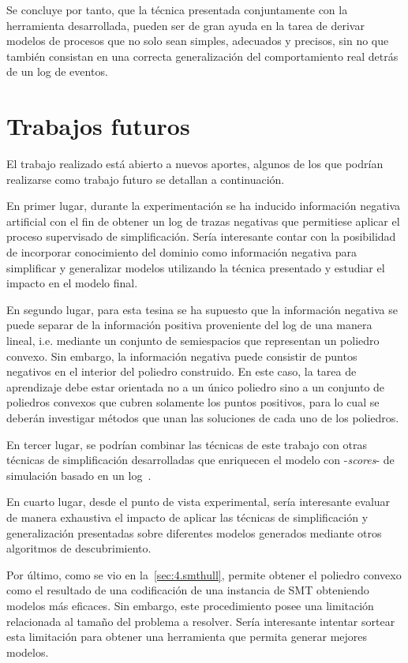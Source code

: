 Se concluye por tanto, que la técnica presentada conjuntamente con la herramienta desarrollada, pueden ser de
gran ayuda en la tarea de derivar modelos de procesos que no solo sean simples, adecuados y precisos, 
sin no que también consistan en una correcta generalización del comportamiento real detrás de un log de eventos.

\section*{Trabajos futuros}

El trabajo realizado está abierto a nuevos aportes, algunos de los que podrían realizarse como 
trabajo futuro se detallan a continuación.

En primer lugar, durante la experimentación se ha inducido información negativa artificial con el fin de obtener 
un log de trazas negativas que permitiese aplicar el proceso supervisado de simplificación. Sería 
interesante contar con la posibilidad de incorporar conocimiento del dominio como información
negativa para simplificar y generalizar modelos utilizando la técnica presentado y estudiar el 
impacto en el modelo final.

En segundo lugar, para esta tesina se ha supuesto que la información negativa se puede separar de la
información positiva proveniente del log de una manera lineal, i.e. mediante un conjunto de semiespacios
que representan un poliedro convexo. Sin embargo, la información negativa puede consistir de puntos negativos en el
interior del poliedro construido. En este caso, la tarea de aprendizaje debe estar orientada no a un único
poliedro sino a un conjunto de poliedros convexos que cubren solamente los puntos positivos, para lo cual
se deberán investigar métodos que unan las soluciones de cada uno de los poliedros.

En tercer lugar, se podrían combinar las técnicas de este trabajo con otras técnicas de simplificación
desarrolladas que enriquecen el modelo con  -\textit{scores}- de simulación basado en un log~\cite{PedroCC15}.

En cuarto lugar, desde el punto de vista experimental, sería interesante evaluar de manera exhaustiva el impacto de
aplicar las técnicas de simplificación y generalización presentadas sobre diferentes modelos generados mediante otros
algoritmos de descubrimiento.

Por último, como se vio en la~\autoref{sec:4.smthull}, \pachtool permite obtener el poliedro convexo como el resultado de una
codificación de una instancia de SMT obteniendo modelos más eficaces. Sin embargo, este procedimiento posee una limitación
relacionada al tamaño del problema a resolver. Sería interesante intentar sortear esta limitación para obtener una herramienta que
permita generar mejores modelos.

